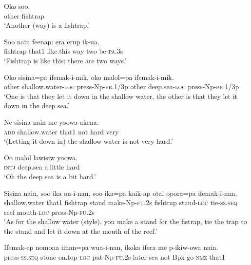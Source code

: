 \ea
\gll  Oko  soo. \\
other  fishtrap \\
\glt ‘Another (way) is a fishtrap.’ \\
\z


\ea
\gll  Soo  nain  feenap:  era  erup  ik-ua. \\
fishtrap  that1  like.this  way  two  be-\textsc{pa}.3s \\
\glt ‘Fishtrap is like this: there are two ways.’ \\
\z


\ea
\gll  Oko  sisina=pa  ifemak-i-mik,  oko  malol=pa               ifemak-i-mik. \\
other  shallow.water-\textsc{loc}  press-Np-\textsc{pr}.1/3p  other  deep.sea-\textsc{loc}  press-Np-\textsc{pr}.1/3p \\


\glt ‘One is that they let it down in the shallow water, the other is that they let it down in the deep sea.’ \\
\z


\ea
\gll  Ne  sisina  nain  me  yoowa  akena. \\
\textsc{add}  shallow.water  that1  not  hard  very \\
\glt ‘(Letting it down in) the shallow water is not very hard.’ \\
\z


\ea
\gll  Oo  malol  lawisiw  yoowa. \\
\textsc{intj}  deep.sea  a.little  hard \\
\glt ‘Oh the deep sea is a bit hard.’ \\
\z


\ea
\gll  Sisina  nain,  soo  ika  on-i-nan,              soo  ika=pa  kaik-ap  otal  opora=pa              ifemak-i-nan. \\
shallow.water  that1  fishtrap  stand  make-Np-\textsc{fu}.2s  fishtrap  stand-\textsc{loc}  tie-\textsc{ss.seq}  reef  mouth-\textsc{loc}  press-Np-\textsc{fu}.2s \\




\glt ‘As for the shallow water (style), you make a stand for the fistrap, tie the trap to the stand and let it down at the mouth of the reef.’ \\
\z


\ea
\gll  Ifemak-ep  nomona  iinan=pa  wua-i-nan,  ikoka  ifera  me  p-ikiw-owa  nain. \\
press-\textsc{ss.seq}  stone  on.top-\textsc{loc}  put-Np-\textsc{fu}.2s  later  sea    not  Bpx-go-\textsc{nmz}  that1 \\


